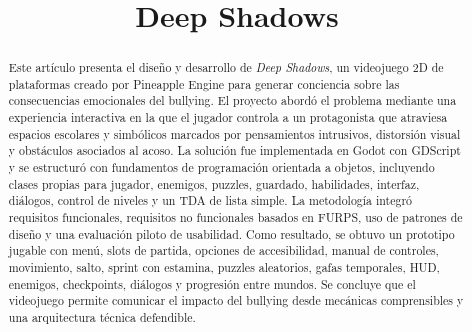 \documentclass[conference]{IEEEtran}
\begin{document}
\title{Deep Shadows}

\author{
}

\maketitle

\begin{abstract}
Este artículo presenta el diseño y desarrollo de \textit{Deep Shadows}, un videojuego 2D de plataformas creado por Pineapple Engine para generar conciencia sobre las consecuencias emocionales del bullying. El proyecto abordó el problema mediante una experiencia interactiva en la que el jugador controla a un protagonista que atraviesa espacios escolares y simbólicos marcados por pensamientos intrusivos, distorsión visual y obstáculos asociados al acoso. La solución fue implementada en Godot con GDScript y se estructuró con fundamentos de programación orientada a objetos, incluyendo clases propias para jugador, enemigos, puzzles, guardado, habilidades, interfaz, diálogos, control de niveles y un TDA de lista simple. La metodología integró requisitos funcionales, requisitos no funcionales basados en FURPS, uso de patrones de diseño y una evaluación piloto de usabilidad. Como resultado, se obtuvo un prototipo jugable con menú, slots de partida, opciones de accesibilidad, manual de controles, movimiento, salto, sprint con estamina, puzzles aleatorios, gafas temporales, HUD, enemigos, checkpoints, diálogos y progresión entre mundos. Se concluye que el videojuego permite comunicar el impacto del bullying desde mecánicas comprensibles y una arquitectura técnica defendible.
\end{abstract}
\end{document}
